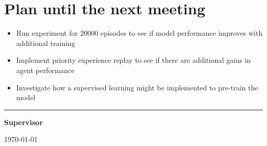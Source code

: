 \documentclass[12pt]{article}
\begin{document}
	\section{Plan until the next meeting}
	\begin{itemize}
		\item Run experiment for 20000 episodes to see if model performance improves with additional training
		\item Implement priority experience replay to see if there are additional gains in agent performance
		\item Investigate how a supervised learning might be implemented to pre-train the model
	\end{itemize}
	\par
	\vspace{\fill}%
	\noindent\rule{0.4\linewidth}{0.5pt}%
	\vspace{1em}%
	\par
	\noindent\textbf{Supervisor}\vspace{1em}%
	\par
	\noindent\today
\end{document}
